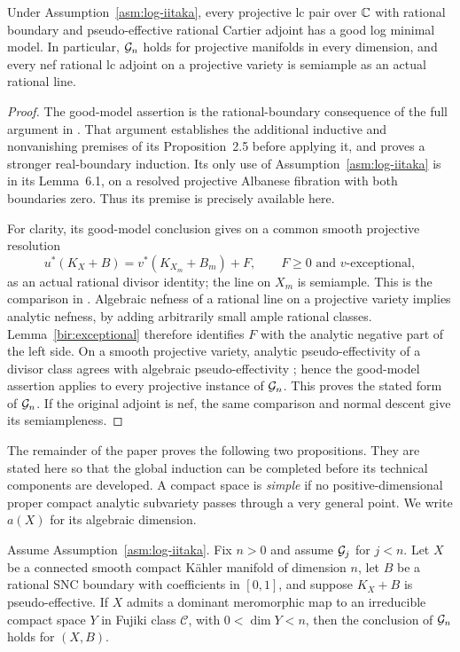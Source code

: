 \begin{proposition}\label{proj:good-models}
Under Assumption~\ref{asm:log-iitaka}, every projective lc pair over
\(\mathbb C\) with rational boundary and pseudo-effective rational Cartier
adjoint has a good log minimal model. In particular, \(\mathcal G_n\) holds
for projective manifolds in every dimension, and every nef rational lc
adjoint on a projective variety is semiample as an actual rational line.
\end{proposition}

\begin{proof}
The good-model assertion is the rational-boundary consequence of the full
argument in \cite[Proposition~2.5, Theorem~9.6, and Section~10]{LI}. That
argument establishes the additional inductive and nonvanishing premises of
its Proposition~2.5 before applying it, and proves a stronger real-boundary
induction. Its only use of Assumption~\ref{asm:log-iitaka} is in its
Lemma~6.1, on a resolved projective Albanese fibration with both boundaries
zero. Thus its premise is precisely available here.

For clarity, its good-model conclusion gives on a common smooth projective
resolution
\[
 u^*(K_X+B)=v^*(K_{X_m}+B_m)+F,
 \qquad F\geq0\text{ and }v\text{-exceptional},
\]
as an actual rational divisor identity; the line on \(X_m\) is semiample.
This is the comparison in \cite[Lemma~2.2]{LI}. Algebraic nefness of a
rational line on a projective variety implies analytic nefness, by adding
arbitrarily small ample rational classes. Lemma~\ref{bir:exceptional}
therefore identifies \(F\) with the analytic negative part of the left
side. On a smooth projective variety, analytic pseudo-effectivity of a
divisor class agrees with algebraic pseudo-effectivity
\cite[Proposition~1.2]{BDPP}; hence the good-model assertion applies to
every projective instance of \(\mathcal G_n\). This proves the stated form of
\(\mathcal G_n\). If the original adjoint
is nef, the same comparison and normal descent give its semiampleness.
\end{proof}

The remainder of the paper proves the following two propositions. They
are stated here so that the global induction can be completed before its
technical components are developed. A compact space is \emph{simple} if
no positive-dimensional proper compact analytic subvariety passes through
a very general point. We write \(a(X)\) for its algebraic dimension.

\begin{proposition}\label{rank:fibration-case}
Assume Assumption~\ref{asm:log-iitaka}. Fix \(n>0\) and assume
\(\mathcal G_j\) for \(j<n\). Let \(X\) be a connected
smooth compact Kähler manifold of dimension \(n\), let \(B\) be a rational
SNC boundary with coefficients in \([0,1]\), and suppose \(K_X+B\) is pseudo-effective. If \(X\) admits
a dominant meromorphic map to an irreducible compact space \(Y\) in Fujiki
class \(\mathcal C\), with \(0<\dim Y<n\), then the conclusion of
\(\mathcal G_n\) holds for \((X,B)\).
\end{proposition}

